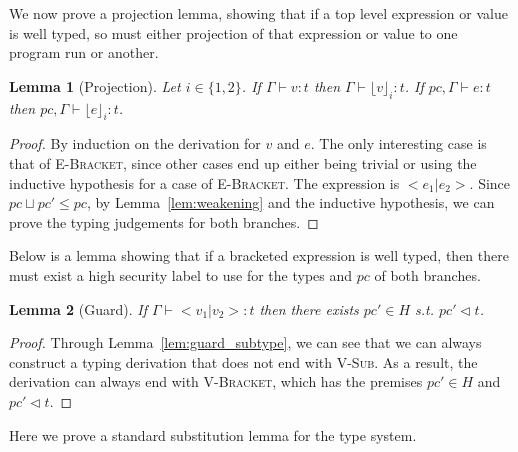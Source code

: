 \documentclass[a4paper,twocolumn]{article}
\newcommand{\typeRule}[3]{#1 \vdash #2 \colon #3}
\newcommand{\guards}[0]{\lhd}
\newcommand{\lift}[1]{\lfloor #1 \rfloor}
\theoremstyle{plain}
\newtheorem{lemma}{Lemma}
\theoremstyle{definition}
\begin{document}
We now prove a projection lemma, showing that if a top level expression or value
is well typed, so must either projection of that expression or value to one
program run or another.

\begin{lemma}[Projection]
  \label{lem:projection}
  Let $i \in \{1, 2\}$.  If $\typeRule{\Gamma}{v}{t}$ then
  $\typeRule{\Gamma}{\lift{v}_i}{t}$.  If $\typeRule{pc, \Gamma}{e}{t}$ then
  $\typeRule{pc, \Gamma}{\lift{e}_i}{t}$.
\end{lemma}
\begin{proof}
  By induction on the derivation for $v$ and $e$.  The only interesting case is
  that of \textsc{E-Bracket}, since other cases end up either being trivial or
  using the inductive hypothesis for a case of \textsc{E-Bracket}.  The
  expression is $<e_1 | e_2>$.  Since $pc \sqcup pc' \leq pc$, by
  Lemma~\ref{lem:weakening} and the inductive hypothesis, we can prove the
  typing judgements for both branches.
\end{proof}

Below is a lemma showing that if a bracketed expression is well typed, then
there must exist a high security label to use for the types and $pc$ of both
branches.

\begin{lemma}[Guard]
  \label{lem:guard}
  If $\typeRule{\Gamma}{< v_1 | v_2 >}{t}$ then there exists $pc' \in H$ s.t.
  $pc' \guards t$.
\end{lemma}
\begin{proof}
  Through Lemma~\ref{lem:guard_subtype}, we can see that we can always construct
  a typing derivation that does not end with \textsc{V-Sub}.  As a result, the
  derivation can always end with \textsc{V-Bracket}, which has the premises $pc'
  \in H$ and $pc' \guards t$.
\end{proof}

Here we prove a standard substitution lemma for the type system.
\end{document}

